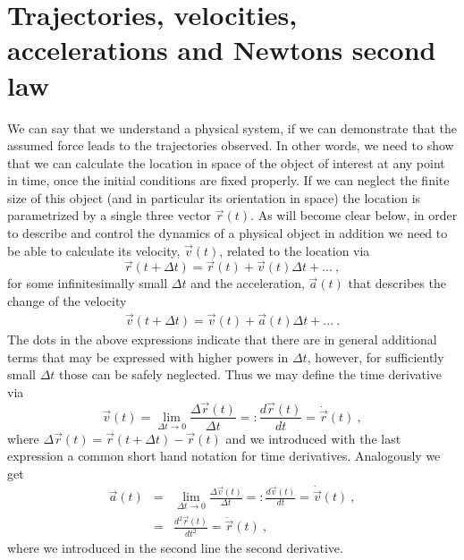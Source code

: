 \documentclass[12pt, UK english]{iopart}
\begin{document}
\section{Trajectories, velocities, accelerations and Newtons second law}\label{sec:tva}

We can say that we understand a physical system, if we can demonstrate that the assumed force leads to the trajectories observed.
In other words, we need to show that we can calculate the location in space of the object of interest at any point in time, once the initial conditions are fixed properly.
If we can neglect the finite size of this object (and in particular its orientation in space) the location is parametrized by a single three vector $\vec r(t)$.
As will become clear below, in order to describe and control the dynamics of a physical object in addition we need to be able to calculate its velocity, $\vec v(t)$, related to the location via
\begin{equation}\label{eq:x_update}
\vec r(t+\Delta t) = \vec r(t) + \vec v(t) \Delta t + ... \ , \label{eq:vdef}
\end{equation}
for some infinitesimally small $\Delta t$ and the acceleration, $\vec a(t)$ that describes the change of the velocity
\begin{eqnarray}\label{eq:v_update}
\vec v(t+\Delta t) = \vec v(t) + \vec a(t) \Delta t + ...\ . \label{eq:adef}
\end{eqnarray}
The dots in the above expressions indicate that there are in general additional terms that may be expressed with higher powers in $\Delta t$, however, for sufficiently small $\Delta t$ those can be safely neglected.
Thus we may define the time derivative via
\begin{equation}
\vec v(t) = \lim_{\Delta t\to 0} \frac{\Delta \vec r(t)}{\Delta t} =: \frac{d\vec r(t)}{dt}  = \dot{\vec  r}(t) \ ,
\end{equation}
where $\Delta \vec r(t)=\vec r(t+\Delta t)-\vec r(t)$ and we introduced with the last expression a common short hand notation for time derivatives.
Analogously we get
\begin{eqnarray}
\vec a(t) &=& \lim_{\Delta t\to 0} \frac{\Delta \vec v(t)}{\Delta t} =: \frac{d\vec v(t)}{dt}  = \dot{\vec v}(t) \ , \\
 &=& \frac{d^2\vec r(t)}{dt^2}  = \ddot{\vec r}(t) \ ,
\end{eqnarray}
where we introduced in the second line the second derivative.
\end{document}
